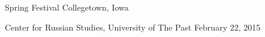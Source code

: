 

\vspace{1ex}

\begin{changemargin}{-0.3in}{0in}
\begin{etaremune}
%

\item
\headedsection %
{Spring Festival}
{Collegetown, Iowa} {

\headedsubsection %
{Center for Russian Studies, University of The Past}
{February 22, 2015}
{\vspace{-\baselineskip}}
}


\end{etaremune}
\end{changemargin}


\spacedhrule{0.5em}{-0.4em} %
